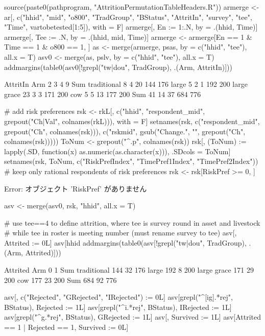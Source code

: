 \begin{Schunk}
\begin{Sinput}
source(paste0(pathprogram, "AttritionPermutationTableHeaders.R"))
armerge <- ar[, c("hhid", "mid", "o800", "TradGroup", "BStatus", "AttritIn", "survey", "tee", "Time", 
  vartobetested[1:5]), with = F]
armerge[, En := 1:.N, by = .(hhid, Time)]
armerge[, Tee := .N, by = .(hhid, mid, Time)]
armerge <- armerge[En == 1 & Time == 1 & o800 == 1, ]
as <- merge(armerge, psas, by = c("hhid", "tee"), all.x = T)
asv0 <- merge(as, pslv, by = c("hhid", "tee"), all.x = T)
addmargins(table0(asv0[!grepl("tw|dou", TradGroup), .(Arm, AttritIn)]))
\end{Sinput}
\begin{Soutput}
             AttritIn
Arm             2   3   4   9 Sum
  traditional   8   4  20 144 176
  large         5   2   1 192 200
  large grace  23   3   3 171 200
  cow           5   5  13 177 200
  Sum          41  14  37 684 776
\end{Soutput}
\begin{Sinput}
# add risk preferences
rsk <- rkL[, c("hhid", "respondent_mid", grepout("Ch|Val", colnames(rkL))), with = F]
setnames(rsk, c("respondent_mid", grepout("Ch", colnames(rsk))), 
  c("rskmid", gsub("Change.", "", grepout("Ch", colnames(rsk)))))
ToNum <- grepout("^.p", colnames(rsk))
rsk[, (ToNum) := lapply(.SD, function(x) as.numeric(as.character(x))), .SDcols = ToNum]
setnames(rsk, ToNum, c("RiskPrefIndex", "TimePref1Index", "TimePref2Index"))
# keep only rational respondents of risk preferences
rsk <- rsk[RiskPref >= 0, ]
\end{Sinput}
\begin{Soutput}
Error:  オブジェクト 'RiskPref' がありません 
\end{Soutput}
\begin{Sinput}
asv <- merge(asv0, rsk, "hhid", all.x = T)
\end{Sinput}
\end{Schunk}
\begin{Schunk}
\begin{Sinput}
# use tee==4 to define attrition, where tee is survey round in asset and livestock 
# while tee in roster is meeting number (must rename survey to tee)
asv[, Attrited := 0L]
asv[hhid %in% hhid[AttritIn < 9], Attrited := 1L]
addmargins(table0(asv[!grepl("tw|dou", TradGroup), .(Arm, Attrited)]))
\end{Sinput}
\begin{Soutput}
             Attrited
Arm             0   1 Sum
  traditional 144  32 176
  large       192   8 200
  large grace 171  29 200
  cow         177  23 200
  Sum         684  92 776
\end{Soutput}
\begin{Sinput}
asv[, c("Rejected", "GRejected", "IRejected") := 0L]
asv[grepl("^[ig].*rej", BStatus), Rejected := 1L]
asv[grepl("^i.*rej", BStatus), IRejected := 1L]
asv[grepl("^g.*rej", BStatus), GRejected := 1L]
asv[, Survived := 1L]
asv[Attrited == 1 | Rejected == 1, Survived := 0L]
\end{Sinput}
\end{Schunk}
